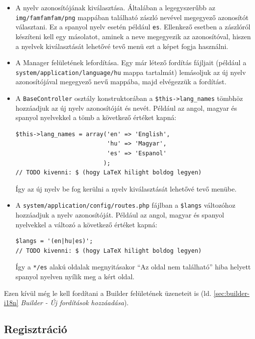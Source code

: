 \documentclass[12pt,a4paper,twoside]{article}
\begin{document}
\begin{itemize}
  \item A nyelv azonosítójának kiválasztása. Általában a legegyszerűbb az
    \texttt{img/famfamfam/png} mappában található zászló nevével megegyező
    azonosítót választani. Ez a spanyol nyelv esetén például
    \texttt{es}. Ellenkező esetben a zászlóról készíteni kell egy
    másolatot, aminek a neve megegyezik az azonosítóval, hiszen a nyelvek
    kiválasztását lehetővé tevő menü ezt a képet fogja használni.
  \item A Manager felületének lefordítása. Egy már létező fordítás fájljait
    (például a \texttt{system/application/language/hu} mappa tartalmát)
    lemásoljuk az új nyelv azonosítójával megegyező nevű mappába, majd
    elvégezzük a fordítást.
  \item A \texttt{BaseController} osztály konstruktorában a
    \texttt{\$this->lang\_names} tömbhöz hozzáadjuk az új nyelv azonosítóját és
    nevét. Például az angol, magyar és spanyol nyelvekkel a tömb a következő
    értéket kapná:
    \begin{lstlisting}[firstnumber=35]
$this->lang_names = array('en' => 'English',
                          'hu' => 'Magyar',
                          'es' => 'Espanol'
                         );
// TODO kivenni: $ (hogy LaTeX hilight boldog legyen)
    \end{lstlisting}
    Így az új nyelv be fog kerülni a nyelv kiválasztását lehetővé tevő menübe.
  \item A \texttt{system/application/config/routes.php} fájlban a
    \texttt{\$langs} változóhoz hozzáadjuk a nyelv azonosítóját. Például az
    angol, magyar és spanyol nyelvekkel a változó a következő értéket kapná:
    \begin{lstlisting}[firstnumber=46]
$langs = '(en|hu|es)';
// TODO kivenni: $ (hogy LaTeX hilight boldog legyen)
    \end{lstlisting}
    Így a \texttt{*/es} alakú oldalak megnyitásakor ``Az oldal nem található''
    hiba helyett spanyol nyelven nyílik meg a kért oldal.

\end{itemize}

Ezen kívül még le kell fordítani a Builder felületének üzeneteit is (ld.
\ref{sec:builder-i18n} \textit{Builder - Új fordítások hozzáadása}).

\subsection{Regisztráció}
\label{sec:reg_check}
\end{document}

